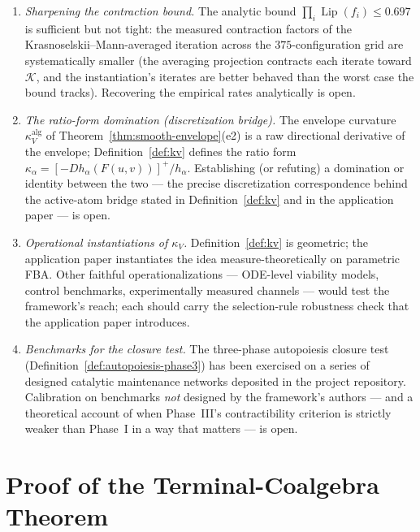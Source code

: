 \documentclass[11pt,a4paper]{article}
\theoremstyle{plain}
\theoremstyle{definition}
\theoremstyle{remark}
\newcommand{\kk}{\kappa_{\!V}}
\DeclareMathOperator{\Lip}{Lip}
\begin{document}
\begin{enumerate}[leftmargin=*,itemsep=3pt]
coherence data, or a proof that no such construction exists under
the stated hypotheses, would close the most significant gap in
Section~\ref{sec:hott} (Remark~\ref{rem:proof-status-hott}).
\item \emph{Sharpening the contraction bound.} The analytic bound
$\prod_i \Lip(f_i) \leq 0.697$ is sufficient but not tight: the
measured contraction factors of the Krasnoselskii--Mann-averaged
iteration across the $375$-configuration grid are systematically
smaller (the averaging projection contracts each iterate toward
$\mathcal K$, and the instantiation's iterates are better behaved
than the worst case the bound tracks). Recovering the
empirical rates analytically is open.
\item \emph{The ratio-form domination (discretization bridge).}
The envelope curvature $\kk^{\mathrm{alg}}$ of
Theorem~\ref{thm:smooth-envelope}(e2) is a raw directional
derivative of the envelope; Definition~\ref{def:kv} defines the
ratio form $\kappa_\alpha = [-D h_\alpha(F(u,v))]^{+}/h_\alpha$.
Establishing (or refuting) a domination or identity between the
two --- the precise discretization correspondence behind the
active-atom bridge stated in Definition~\ref{def:kv} and in the
application paper \citep{zai2026measure} --- is open.
\item \emph{Operational instantiations of $\kk$.}
Definition~\ref{def:kv} is geometric; the application paper
\citep{zai2026measure} instantiates the idea measure-theoretically
on parametric FBA. Other faithful operationalizations --- ODE-level
viability models, control benchmarks, experimentally measured
channels --- would test the framework's reach; each should carry the selection-rule robustness check that the application paper introduces.
\item \emph{Benchmarks for the closure test.} The three-phase
autopoiesis closure test (Definition~\ref{def:autopoiesis-phase3})
has been exercised on a series of designed catalytic maintenance
networks deposited in the project repository. Calibration on
benchmarks \emph{not} designed by the framework's authors --- and a
theoretical account of when Phase~III's contractibility criterion is
strictly weaker than Phase~I in a way that matters --- is open.
\end{enumerate}


\appendix
\section{Proof of the Terminal-Coalgebra Theorem}
\label{app:terminal-coalgebra}
\end{document}
